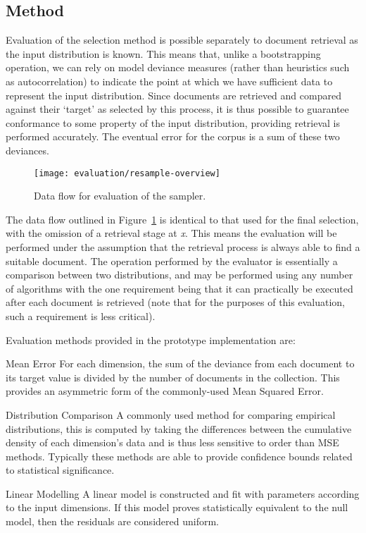 \subsection{Method}
Evaluation of the selection method is possible separately to document retrieval as the input distribution is known.  This means that, unlike a bootstrapping operation, we can rely on model deviance measures (rather than heuristics such as autocorrelation) to indicate the point at which we have sufficient data to represent the input distribution.  Since documents are retrieved and compared against their `target' as selected by this process, it is thus possible to guarantee conformance to some property of the input distribution, providing retrieval is performed accurately.  The eventual error for the corpus is a sum of these two deviances.


\begin{figure}[Ht]
    \centering
    \texttt{[image: evaluation/resample-overview]}
    \caption{Data flow for evaluation of the sampler.}
    \label{fig:evaluation:resampling:overview}
\end{figure}


The data flow outlined in Figure~\ref{fig:evaluation:resampling:overview} is identical to that used for the final selection, with the omission of a retrieval stage at \textsl{\color{red} x}.  This means the evaluation will be performed under the assumption that the retrieval process is always able to find a suitable document.  The operation performed by the evaluator is essentially a comparison between two distributions, and may be performed using any number of algorithms with the one requirement being that it can practically be executed after each document is retrieved (note that for the purposes of this evaluation, such a requirement is less critical).

Evaluation methods provided in the prototype implementation are:

\begin{itemizeTitle}

    \item[Mean Error] For each dimension, the sum of the deviance from each document to its target value is divided by the number of documents in the collection.  This provides an asymmetric form of the commonly-used Mean Squared Error.
    \item[Distribution Comparison] A commonly used method for comparing empirical distributions, this is computed by taking the differences between the cumulative density of each dimension's data and is thus less sensitive to order than MSE methods.  Typically these methods are able to provide confidence bounds related to statistical significance.
    \item[Linear Modelling] A linear model is constructed and fit with parameters according to the input dimensions.  If this model proves statistically equivalent to the null model, then the residuals are considered uniform.

\end{itemizeTitle}


